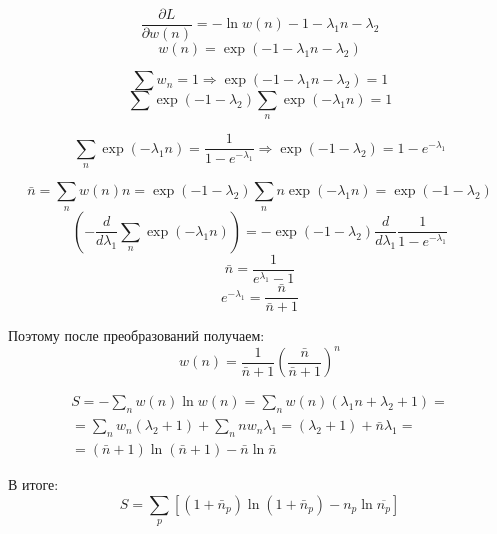 \documentclass[a4paper,12pt]{article} %
\begin{document}
\begin{task}
$$
\frac{\partial L}{\partial w(n)}=-\ln w(n)-1 -\lambda_1 n - \lambda_2
$$
$$
w(n)=\exp\left(-1-\lambda_{1} n-\lambda_{2}\right)
$$

$$
\sum w_{n}=1 \Rightarrow \exp \left(-1-\lambda_{1} n-\lambda_{2}\right)=1
$$
$$\sum
\exp \left(-1-\lambda_{2}\right) \sum_{n} \exp (-\lambda_1 n)=1
$$

$$
\sum_{n} \operatorname{exp}\left(-\lambda_{1} n\right)=
\frac{1}{1-e^{-\lambda_{1}}} \Rightarrow \operatorname{exp}\left(-1-\lambda_{2}\right)=1-e^{-\lambda_{1}}
$$


$$
\bar{n}=\sum_{n} w(n) n=\exp \left(-1-\lambda_{2}\right) \sum_{n} n 
\exp \left(-\lambda_{1} n\right)=\exp \left(-1-\lambda_{2}\right)
$$
\[ \left(-\frac{d}{d \lambda_1} \sum_{n} \exp \left(-\lambda_{1} n\right)\right)=-\exp \left(-1-\lambda_{2}\right) \frac{d}{d \lambda_{1}} \frac{1}{1-e^{-\lambda_{1}}} \]
%
\[ \bar{n}=\frac{1}{e^{\lambda_{1}}-1 } \]
\[ e^{-\lambda_{1}}=\frac{\bar{n}}{\bar{n}+1} \]




Поэтому после преобразований получаем:
$$
w(n)=\frac{1}{\bar{n}+1}
\left(\frac{\bar{n}}{\bar{n}+1}\right)^{n}
$$


\begin{multline}
S=-\sum_{n} w(n) \ln w(n)=\sum_{n} w(n)\left(\lambda_{1} n+\lambda_{2}+1\right) =\\
= \sum_{n} w_{n}\left(\lambda_{2}+1\right)+\sum_{n} n w_{n} \lambda_{1}=\left(\lambda_{2}+1\right)+\bar{n} \lambda_{1}=\\
=(\bar{n}+1) \ln (\bar{n}+1)-\bar{n} \ln \bar{n}
\end{multline}

В итоге:
$$
S=\sum_{p}\left[\left(1+\bar{n}_{p}\right) \ln \left(1+\bar{n}_{p}\right)-n_{p} \ln \overline{n_{p}}\right]
$$



\end{task}
\end{document}

